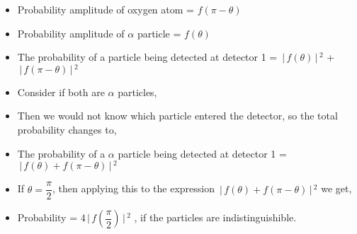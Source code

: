 \documentclass[aspectratio=169]{beamer}
\begin{document}
\begin{frame}

	\begin{itemize}
	
		\item Probability amplitude of oxygen atom = $f(\pi-\theta)$ \newline
		\item Probability amplitude of $\alpha$ particle = $f(\theta)$ \newline
		\item The probability of a particle 
		being detected at detector 1 = $ \,\Bigr\rvert\,f(\theta) \,\Bigr\rvert\,^{2} $ + $ \,\Bigr\rvert\,f(\pi - \theta) \,\Bigr\rvert\,^{2} $
		
 	\end{itemize}
 	
\end{frame}

\begin{frame}{}

	\begin{itemize}

\item Consider if both are $ \alpha $ particles, \newline
\item Then we would not know which particle entered the detector, so the total probability changes to,  \newline
\item  The probability of a $ \alpha $ particle 
		being detected at detector 1 = $ \,\Bigr\rvert\,f(\theta) + f(\pi - \theta) \,\Bigr\rvert\,^{2} $
		
	\end{itemize}
	
\end{frame}

\begin{frame}

	\begin{itemize}

		\item If  $\theta = \dfrac{\pi}{2}$,  then applying this to the expression  $\,\Bigr\rvert\,f(\theta)+f(\pi-\theta)\,\Bigr\rvert\,^{2}$ we get, \newline
		\item Probability = $4 \,\Bigr\rvert\,f\left(\dfrac{\pi}{2}\right) \,\Bigr\rvert\,^{2}$ , if the particles are indistinguishible.
		
	\end{itemize}
	
\end{frame}
\end{document}
